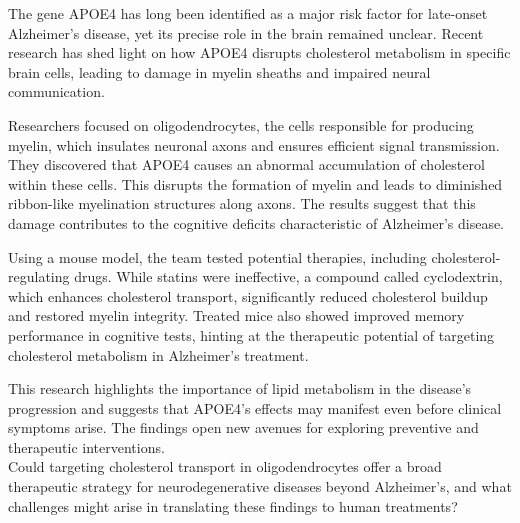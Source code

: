 \documentclass[12pt]{article}
\begin{document}
The gene APOE4 has long been identified as a major risk factor for late-onset Alzheimer’s disease, yet its precise role in the brain remained unclear. Recent research has shed light on how APOE4 disrupts cholesterol metabolism in specific brain cells, leading to damage in myelin sheaths and impaired neural communication.  

Researchers focused on oligodendrocytes, the cells responsible for producing myelin, which insulates neuronal axons and ensures efficient signal transmission. They discovered that APOE4 causes an abnormal accumulation of cholesterol within these cells. This disrupts the formation of myelin and leads to diminished ribbon-like myelination structures along axons. The results suggest that this damage contributes to the cognitive deficits characteristic of Alzheimer’s disease.  

Using a mouse model, the team tested potential therapies, including cholesterol-regulating drugs. While statins were ineffective, a compound called cyclodextrin, which enhances cholesterol transport, significantly reduced cholesterol buildup and restored myelin integrity. Treated mice also showed improved memory performance in cognitive tests, hinting at the therapeutic potential of targeting cholesterol metabolism in Alzheimer’s treatment.  

This research highlights the importance of lipid metabolism in the disease’s progression and suggests that APOE4’s effects may manifest even before clinical symptoms arise. The findings open new avenues for exploring preventive and therapeutic interventions.\\[5px]  

Could targeting cholesterol transport in oligodendrocytes offer a broad therapeutic strategy for neurodegenerative diseases beyond Alzheimer’s, and what challenges might arise in translating these findings to human treatments?  
\end{document}
